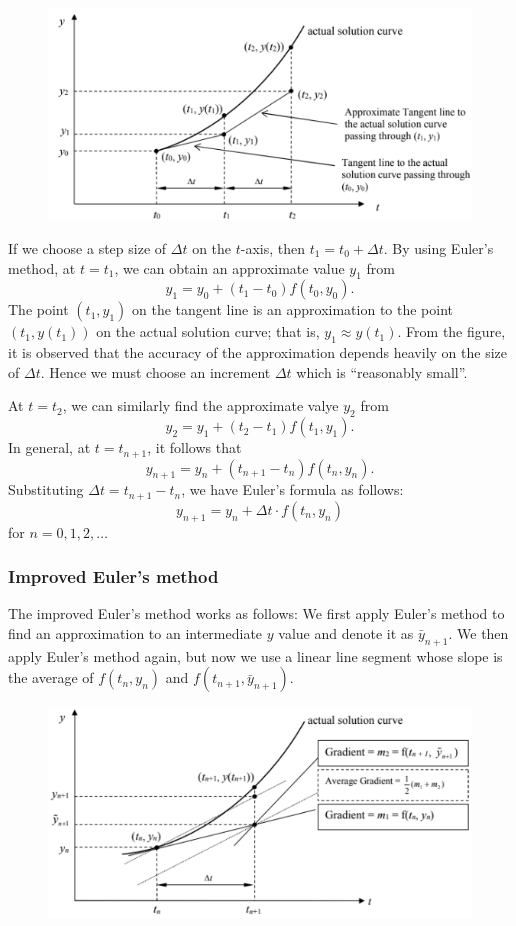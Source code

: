 \begin{figure}[H]
    \centering
    \includegraphics[width=0.75\linewidth]{images/euler-method-de.png}
\end{figure}

If we choose a step size of $\Delta t$ on the $t$-axis, then $t_1=t_0+\Delta t$. By using Euler's method, at $t=t_1$, we can obtain an approximate value $y_1$ from
\[ y_1=y_0+(t_1-t_0)f(t_0,y_0). \]
The point $(t_1,y_1)$ on the tangent line is an approximation to the point $(t_1,y(t_1))$ on the actual solution curve; that is, $y_1\approx y(t_1)$. From the figure, it is observed that the accuracy of the approximation depends heavily on the size of $\Delta t$. Hence we must choose an increment $\Delta t$ which is ``reasonably small''.

At $t=t_2$, we can similarly find the approximate valye $y_2$ from
\[ y_2=y_1+(t_2-t_1)f(t_1,y_1). \]
In general, at $t=t_{n+1}$, it follows that
\[ y_{n+1}=y_n+(t_{n+1}-t_n)f(t_n,y_n). \]
Substituting $\Delta t=t_{n+1}-t_n$, we have Euler's formula as follows:
\begin{equation}
y_{n+1}=y_n+\Delta t\cdot f(t_n,y_n)
\end{equation}
for $n=0,1,2,\dots$

\subsubsection{Improved Euler's method}
The improved Euler's method works as follows: We first apply Euler's method to find an approximation to an intermediate $y$ value and denote it as $\bar{y}_{n+1}$. We then apply Euler's method again, but now we use a linear line segment whose slope is the average of $f(t_n,y_n)$ and $f(t_{n+1},\bar{y}_{n+1})$.

\begin{figure}[H]
    \centering
    \includegraphics[width=0.75\linewidth]{images/euler-method-de-improved.png}
\end{figure}

